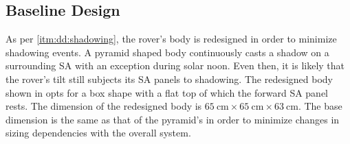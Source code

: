 \subsection{Baseline Design}
As per \ref{itm:dd:shadowing}, the rover's body is redesigned in order to minimize shadowing events. A pyramid shaped body continuously casts a shadow on a surrounding \ac{SA} with an exception during solar noon. Even then, it is likely that the rover's tilt still subjects its \ac{SA} panels to shadowing. The redesigned body shown in  opts for a box shape with a flat top of which the forward \ac{SA} panel rests. The dimension of the redesigned body is $\SI{65}{\centi\meter}\times\SI{65}{\centi\meter}\times\SI{63}{\centi\meter}$. The base dimension is the same as that of the pyramid's in order to minimize changes in sizing dependencies with the overall system.

